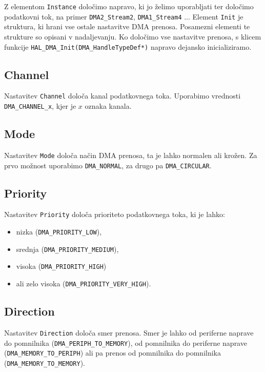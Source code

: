 \documentclass[12pt,letterpaper]{article}
\begin{document}
Z elementom \texttt{Instance} določimo napravo, ki jo želimo uporabljati ter določimo podatkovni tok, na primer \texttt{DMA2\_Stream2}, \texttt{DMA1\_Stream4} ... Element \texttt{Init} je struktura, ki hrani vse ostale nastavitve DMA prenosa. Posamezni elementi te strukture so opisani v nadaljevanju. Ko določimo vse nastavitve prenosa, s klicem funkcije \texttt{HAL\_DMA\_Init(DMA\_HandleTypeDef*)} napravo dejansko inicializiramo.

\subsection*{Channel}

Nastavitev \texttt{Channel} določa kanal podatkovnega toka. Uporabimo vrednosti \texttt{DMA\_CHANNEL\_x}, kjer je $x$ oznaka kanala.


\subsection*{Mode}

Nastavitev \texttt{Mode} določa način DMA prenosa, ta je lahko normalen ali krožen. Za prvo možnost uporabimo \texttt{DMA\_NORMAL}, za drugo pa \texttt{DMA\_CIRCULAR}.

\subsection*{Priority}

Nastavitev \texttt{Priority} določa prioriteto podatkovnega toka, ki je lahko:

\begin{itemize}
    \item nizka (\texttt{DMA\_PRIORITY\_LOW}),
    \item srednja (\texttt{DMA\_PRIORITY\_MEDIUM}),
    \item visoka (\texttt{DMA\_PRIORITY\_HIGH})
    \item ali zelo visoka (\texttt{DMA\_PRIORITY\_VERY\_HIGH}).
\end{itemize}

\subsection*{Direction}

Nastavitev \texttt{Direction} določa smer prenosa. Smer je lahko od periferne naprave do pomnilnika (\texttt{DMA\_PERIPH\_TO\_MEMORY}), od pomnilnika do periferne naprave (\texttt{DMA\_MEMORY\_TO\_PERIPH}) ali pa prenos od pomnilnika do pomnilnika (\texttt{DMA\_MEMORY\_TO\_MEMORY}).
\end{document}
